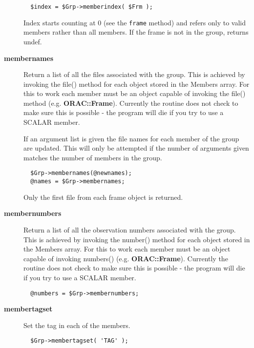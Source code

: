 \begin{description}
\begin{verbatim}
  $index = $Grp->memberindex( $Frm );
\end{verbatim}


Index starts counting at 0 (see the \texttt{frame} method)
and refers only to valid members rather than all members.
If the frame is not in the group, returns undef.


\item[\textbf{membernames}] \mbox{}

Return a list of all the files associated with the group. This is
achieved by invoking the file() method for each object stored in the
Members array.  For this to work each member must be an object capable
of invoking the file() method (e.g. \textbf{ORAC::Frame}). Currently the
routine does not check to make sure this is possible - the program
will die if you try to use a SCALAR member.



If an argument list is given the file names for each member of the
group are updated. This will only be attempted if the number of 
arguments given matches the number of members in the group.

\begin{verbatim}
  $Grp->membernames(@newnames);
  @names = $Grp->membernames;
\end{verbatim}


Only the first file from each frame object is returned.


\item[\textbf{membernumbers}] \mbox{}

Return a list of all the observation numbers associated with
the group. This is achieved by invoking the number() method for
each object stored in the Members array.
For this to work each member must be an object capable of invoking
numbers() (e.g. \textbf{ORAC::Frame}). Currently the routine does not check
to make sure this is possible - the program will die if you try
to use a SCALAR member.

\begin{verbatim}
  @numbers = $Grp->membernumbers;
\end{verbatim}

\item[\textbf{membertagset}] \mbox{}

Set the tag in each of the members.

\begin{verbatim}
  $Grp->membertagset( 'TAG' );
\end{verbatim}



\end{description}
